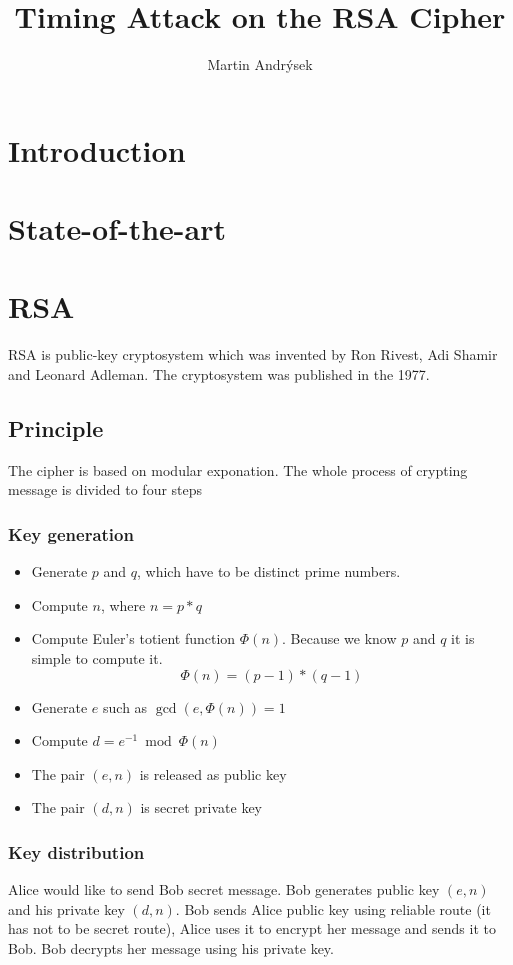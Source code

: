 \documentclass[thesis=B,english]{FITthesis}[2012/10/20]
\title{Timing Attack on the RSA Cipher}
\author{Martin Andr{\' y}sek} %
\begin{document}

\chapter{Introduction}



\chapter{State-of-the-art}

\chapter{RSA}
{RSA is public-key cryptosystem which was invented by Ron Rivest, Adi Shamir and Leonard Adleman. The cryptosystem was published in the 1977.}

\section{Principle}
{The cipher is based on modular exponation. The whole process of crypting message is divided to four steps}

\subsection{Key generation}
\begin{itemize}
 \item Generate \(p\) and \(q\), which have to be distinct prime numbers.
 \item Compute \(n\), where \(n = p * q\)
 \item Compute Euler's totient function \(\Phi(n)\). Because we know \(p\) and \(q\) it is simple to compute it. \[\Phi(n) = (p - 1)*(q - 1)\]
 \item Generate \(e\) such as \(\gcd(e,\Phi(n)) = 1\) 
 \item Compute \(d = e^{-1}\bmod{\Phi(n)} \)
 \item The pair \((e,n)\) is released as public key
 \item The pair \((d,n)\) is secret private key
\end{itemize}

\subsection{Key distribution}
{Alice would like to send Bob secret message. Bob generates public key \((e,n)\) and his private key \((d,n)\). Bob sends Alice public key using reliable route (it has not to be secret route),
Alice uses it to encrypt her message and sends it to Bob. Bob decrypts her message using his private key.} 
\end{document}
